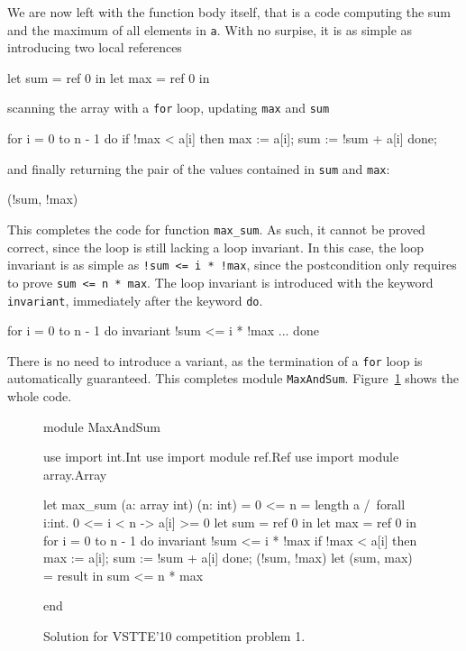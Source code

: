 We are now left with the function body itself, that is a code
computing the sum and the maximum of all elements in \texttt{a}. With
no surpise, it is as simple as introducing two local references
\begin{whycode}
    let sum = ref 0 in
    let max = ref 0 in
\end{whycode}
scanning the array with a \texttt{for} loop, updating \texttt{max}
and \texttt{sum}
\begin{whycode}
    for i = 0 to n - 1 do
      if !max < a[i] then max := a[i];
      sum := !sum + a[i]
    done;
\end{whycode}
and finally returning the pair of the values contained in \texttt{sum}
and \texttt{max}:
\begin{whycode}
  (!sum, !max)
\end{whycode}
This completes the code for function \texttt{max\_sum}.
As such, it cannot be proved correct, since the loop is still lacking
a loop invariant. In this case, the loop invariant is as simple as
\verb|!sum <= i * !max|, since the postcondition only requires to prove
\verb|sum <= n * max|. The loop invariant is introduced with the
keyword \texttt{invariant}, immediately after the keyword \texttt{do}.
\begin{whycode}
    for i = 0 to n - 1 do
      invariant { !sum <= i * !max }
      ...
    done
\end{whycode}
There is no need to introduce a variant, as the termination of a
\texttt{for} loop is automatically guaranteed.
This completes module \texttt{MaxAndSum}.
Figure~\ref{fig:MaxAndSum} shows the whole code.
\begin{figure}
  \centering
\begin{whycode}
module MaxAndSum

  use import int.Int
  use import module ref.Ref
  use import module array.Array

  let max_sum (a: array int) (n: int) =
    { 0 <= n = length a /\ forall i:int. 0 <= i < n -> a[i] >= 0 }
    let sum = ref 0 in
    let max = ref 0 in
    for i = 0 to n - 1 do
      invariant { !sum <= i * !max }
      if !max < a[i] then max := a[i];
      sum := !sum + a[i]
    done;
    (!sum, !max)
    { let (sum, max) = result in sum <= n * max }

end
\end{whycode}
\vspace*{-2em}\hrulefill
  \caption{Solution for VSTTE'10 competition problem 1.}
  \label{fig:MaxAndSum}
\end{figure}
